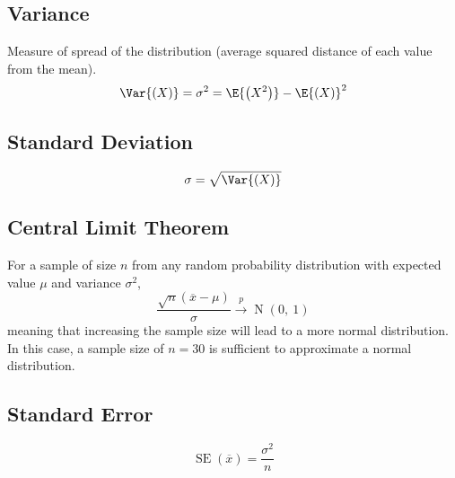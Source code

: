 \documentclass{article}
\begin{document}
\begin{multicols}{3}
        \subsection{Variance}
        Measure of spread of the distribution (average squared distance of each value from the mean).
        \begin{equation*}
            \Var{\left( X \right)} = \sigma^2 = \E{\left( X^2 \right)} - \E{\left( X \right)}^2
        \end{equation*}
        \subsection{Standard Deviation}
        \begin{equation*}
            \sigma = \sqrt{\Var{\left( X \right)}}
        \end{equation*}
        

\subsection{Central Limit Theorem}
For a sample of size \(n\) from any random probability distribution with expected value \(\mu\)
and variance \(\sigma^2\),
\begin{equation*}
    \frac{\sqrt{n}\left( \overline{x} - \mu \right)}{\sigma} \overset{p}{\rightarrow} \operatorname{N}{\left( 0,\: 1 \right)}
\end{equation*}
meaning that increasing the sample size will lead to a more normal distribution.
In this case, a sample size of \(n = 30\) is sufficient to approximate a normal distribution.
\subsection{Standard Error}
\begin{equation*}
    \operatorname{SE}{\left( \overline{x} \right)} = \frac{\sigma^2}{n}
\end{equation*}

\end{multicols}
\end{document}
